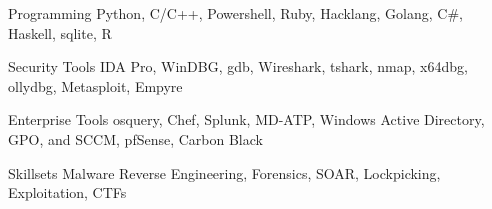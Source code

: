 


\begin{cvskills}


\cvskill
{Programming} %
{Python, C/C++, Powershell, Ruby, Hacklang, Golang, C\#, Haskell, sqlite, R} %


\cvskill
{Security Tools} %
{IDA Pro, WinDBG, gdb, Wireshark, tshark, nmap, x64dbg, ollydbg, Metasploit, Empyre} %


\cvskill
{Enterprise Tools} %
{osquery, Chef, Splunk, MD-ATP, Windows Active Directory, GPO, and SCCM, pfSense, Carbon Black} %


\cvskill
{Skillsets} %
{Malware Reverse Engineering, Forensics, SOAR, Lockpicking, Exploitation, CTFs} %


\end{cvskills}
